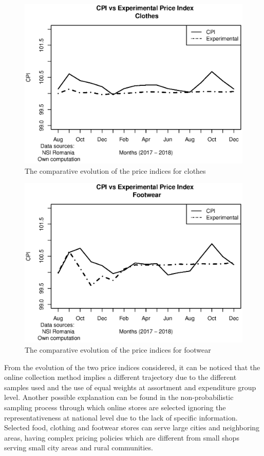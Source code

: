 \documentclass[]{article}
\begin{document}
\begin{figure}
\centering
\includegraphics[width=0.7\linewidth]{fig4.eps}
\caption{The comparative evolution of the price indices for clothes}
\label{fig:4}
\end{figure}


\begin{figure}
\centering
\includegraphics[width=0.7\linewidth]{fig5.eps}
\caption{The comparative evolution of the price indices for footwear}
\label{fig:5}
\end{figure}


From the evolution of the two price indices considered, it can be noticed that the online 
collection method implies a different trajectory due to the different samples used and the use 
of equal weights at assortment and expenditure group level. Another possible explanation can be found 
in the non-probabilistic sampling process through which online stores are selected ignoring the 
representativeness at national level due to the lack of specific information. Selected food, 
clothing and footwear stores can serve large cities and neighboring areas, having complex pricing 
policies which are different from small shops serving small city areas and rural communities.
\end{document}
